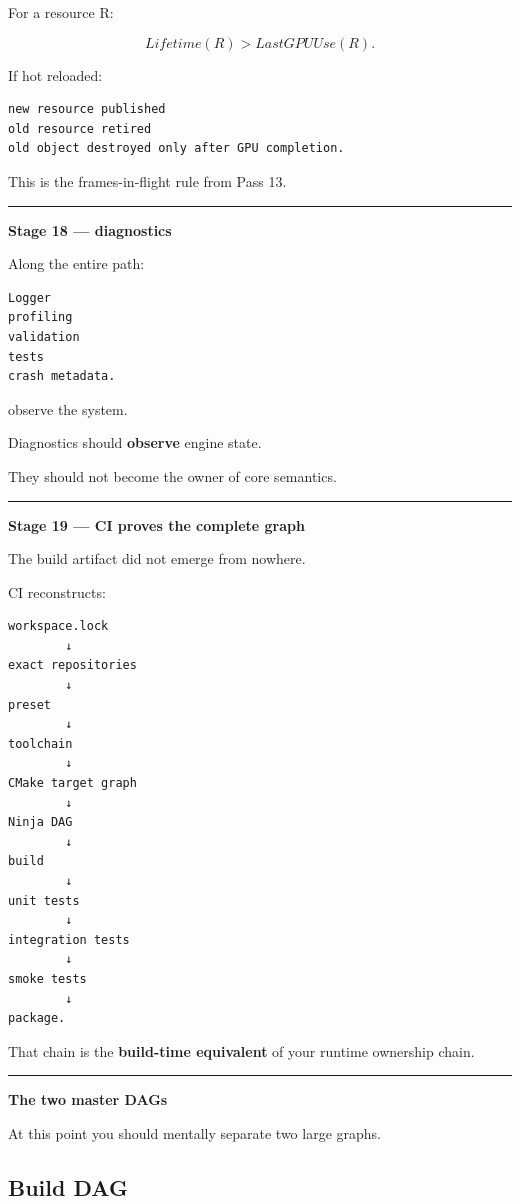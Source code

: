 For a resource R:

\[
Lifetime(R)
>
LastGPUUse(R).
\]

If hot reloaded:

\begin{verbatim}
new resource published
old resource retired
old object destroyed only after GPU completion.
\end{verbatim}

This is the frames-in-flight rule from Pass 13.

\begin{center}\rule{0.5\linewidth}{0.5pt}\end{center}

\textbf{Stage 18 --- diagnostics}

Along the entire path:

\begin{verbatim}
Logger
profiling
validation
tests
crash metadata.
\end{verbatim}

observe the system.

Diagnostics should \textbf{observe} engine state.

They should not become the owner of core semantics.

\begin{center}\rule{0.5\linewidth}{0.5pt}\end{center}

\textbf{Stage 19 --- CI proves the complete graph}

The build artifact did not emerge from nowhere.

CI reconstructs:

\begin{verbatim}
workspace.lock
        ↓
exact repositories
        ↓
preset
        ↓
toolchain
        ↓
CMake target graph
        ↓
Ninja DAG
        ↓
build
        ↓
unit tests
        ↓
integration tests
        ↓
smoke tests
        ↓
package.
\end{verbatim}

That chain is the \textbf{build-time equivalent} of your runtime ownership chain.

\begin{center}\rule{0.5\linewidth}{0.5pt}\end{center}

\textbf{The two master DAGs}

At this point you should mentally separate two large graphs.

\subsection{Build DAG}\label{05-engine-i-ch012-build-dag}

